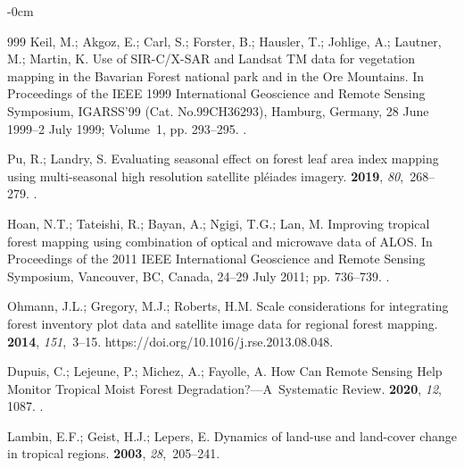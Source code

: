 \documentclass[applsci,article,accept,pdftex,moreauthors]{Definitions/mdpi}
\begin{document}
\begin{adjustwidth}{-\extralength}{0cm}
\begin{thebibliography}{999}
Keil, M.; Akgoz, E.; Carl, S.; Forster, B.; Hausler, T.; Johlige, A.; Lautner,
  M.; Martin, K.
\newblock Use of SIR-C/X-SAR and Landsat TM data for vegetation mapping in the
  Bavarian Forest national park and in the Ore Mountains.
\newblock In Proceedings of the IEEE 1999 International Geoscience and Remote
  Sensing Symposium, IGARSS'99 (Cat. No.99CH36293), {Hamburg, Germany, 28 June 1999--2 July 1999;}  Volume~1, pp.
  293--295.
.

Pu, R.; Landry, S.
\newblock Evaluating seasonal effect on forest leaf area index mapping using
  multi-seasonal high resolution satellite pléiades imagery.
 {\bf 2019}, {\em 80},~268--279.
.

Hoan, N.T.; Tateishi, R.; Bayan, A.; Ngigi, T.G.; Lan, M.
\newblock Improving tropical forest mapping using combination of optical and
  microwave data of ALOS.
\newblock In Proceedings of the 2011 IEEE International Geoscience and Remote
  Sensing Symposium, {Vancouver, BC, Canada,  24--29 July 2011;}  pp. 736--739.
.

Ohmann, J.L.; Gregory, M.J.; Roberts, H.M.
\newblock Scale considerations for integrating forest inventory plot data and
  satellite image data for regional forest mapping.
 {\bf 2014}, {\em 151},~3--15. {{https://doi.org/10.1016/j.rse.2013.08.048}}.

Dupuis, C.; Lejeune, P.; Michez, A.; Fayolle, A.
\newblock How Can Remote Sensing Help Monitor Tropical Moist Forest
  Degradation?—A~Systematic Review.
 {\bf 2020}, {\em 12}, 1087.
.

Lambin, E.F.; Geist, H.J.; Lepers, E.
\newblock Dynamics of land-use and land-cover change in tropical regions.
 {\bf 2003}, {\em
  28},~205--241.


\end{thebibliography}
\end{adjustwidth}
\end{document}
